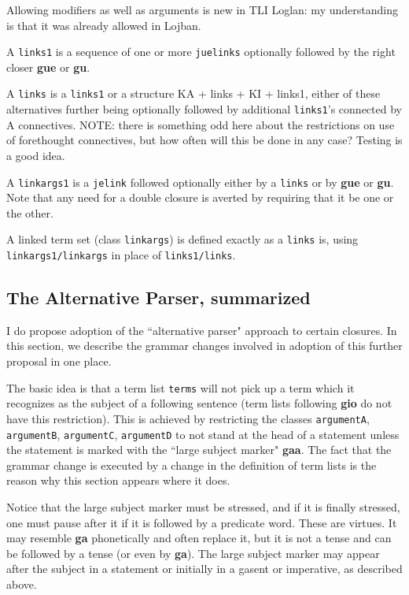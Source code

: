 \documentclass[12pt]{book}
\begin{document}
{Allowing modifiers as well as arguments is new in TLI Loglan:  my understanding is that it was already allowed in Lojban.

A {\tt links1} is a sequence of one or more {\tt juelinks} optionally followed by the right closer {\bf gue} or {\bf gu}.

A {\tt links} is a {\tt links1} or a structure  KA + links + KI  + links1, either of these alternatives further being optionally followed by additional {\tt links1}'s
connected by A connectives.  NOTE:  there is something odd here about the restrictions on use of forethought connectives, but how often will this be done in any case?  Testing is a good idea.

A {\tt linkargs1} is a {\tt jelink} followed optionally either by a {\tt links} or by {\bf gue} or {\bf gu}.  Note that any need for a double closure is averted by requiring that it be one or the other.

A linked term set (class {\tt linkargs}) is defined exactly as a {\tt links} is, using {\tt linkargs1/linkargs} in place of {\tt links1/links}.

\subsection{The Alternative Parser, summarized}

I do propose adoption of the ``alternative parser" approach to certain closures.  In this section, we describe the grammar changes involved in adoption of this further proposal in one place.

The basic idea is that a term list {\tt terms} will not pick up a term which it recognizes as the subject of a following sentence (term lists following {\bf gio} do not have this restriction).  This is achieved by
restricting the classes {\tt argumentA}, {\tt argumentB}, {\tt argumentC}, {\tt argumentD} to not stand at the head of a statement unless the statement
is marked with the ``large subject marker" {\bf gaa}.   The fact that the grammar change is executed by a change in the definition of term lists is the reason why this section appears where it does.

Notice that the large subject marker must be stressed, and if it is finally stressed, one must pause after it if it is followed by a predicate word.  These are virtues.  It may resemble {\bf ga} phonetically and often replace it, but it is not a tense and can be followed by a tense (or even by {\bf ga}).  The large subject marker may appear after the subject in
a statement or initially in a gasent or imperative, as described above.

}
\end{document}
